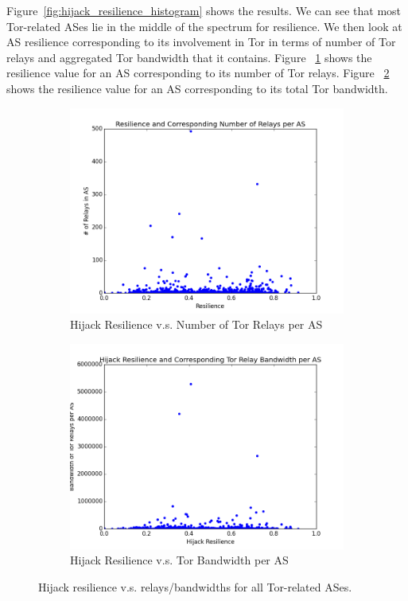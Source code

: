 Figure~\ref{fig:hijack_resilience_histogram} shows the results. We can see that most Tor-related ASes lie in the middle of the spectrum for resilience. We then look at AS resilience corresponding to its involvement in Tor in terms of number of Tor relays and aggregated Tor bandwidth that it contains. Figure ~\ref{fig:res_relays} shows the resilience value for an AS corresponding to its number of Tor relays. Figure ~\ref{fig:hijack_bw} shows the resilience value for an AS corresponding to its total Tor bandwidth. 

\begin{figure}[ht!]
\centering
\begin{subfigure}{.25\textwidth}
  \centering
  \includegraphics[width=\linewidth]{new_resilience_per_as}
  \caption{Hijack Resilience v.s. Number of Tor Relays per AS}
  \label{fig:res_relays}
\end{subfigure}%
\begin{subfigure}{.25\textwidth}
  \centering
  \includegraphics[width=\linewidth]{new_bandwidth}
  \caption{Hijack Resilience v.s. Tor Bandwidth per AS}
  \label{fig:hijack_bw}
\end{subfigure}
\caption{Hijack resilience v.s. relays/bandwidths for all Tor-related ASes.}
\label{fig:hijack_as}
\end{figure}

